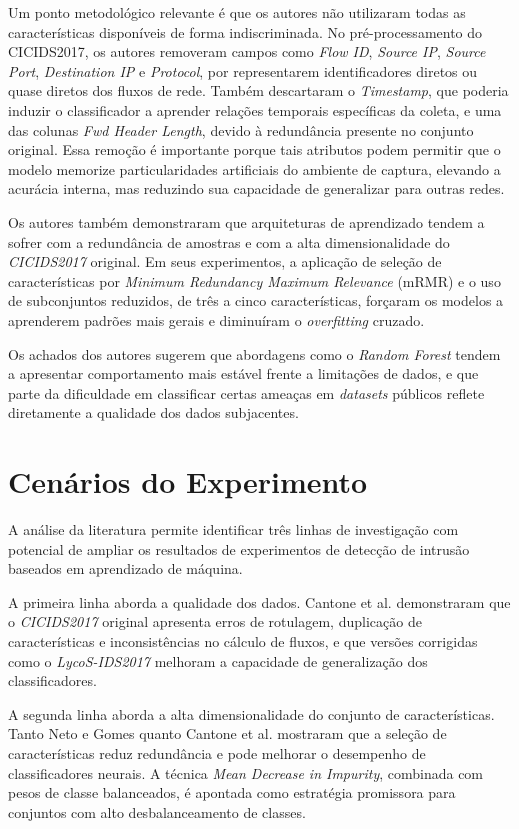 Um ponto metodológico relevante é que os autores não utilizaram todas as características disponíveis de forma indiscriminada. No pré-processamento do CICIDS2017, os autores removeram campos como \textit{Flow ID}, \textit{Source IP}, \textit{Source Port}, \textit{Destination IP} e \textit{Protocol}, por representarem identificadores diretos ou quase diretos dos fluxos de rede. Também descartaram o \textit{Timestamp}, que poderia induzir o classificador a aprender relações temporais específicas da coleta, e uma das colunas \textit{Fwd Header Length}, devido à redundância presente no conjunto original. Essa remoção é importante porque tais atributos podem permitir que o modelo memorize particularidades artificiais do ambiente de captura, elevando a acurácia interna, mas reduzindo sua capacidade de generalizar para outras redes.

Os autores também demonstraram que arquiteturas de aprendizado tendem a sofrer com a redundância de amostras e com a alta dimensionalidade do \textit{CICIDS2017} original. Em seus experimentos, a aplicação de seleção de características por \textit{Minimum Redundancy Maximum Relevance} (mRMR) e o uso de subconjuntos reduzidos, de três a cinco características, forçaram os modelos a aprenderem padrões mais gerais e diminuíram o \textit{overfitting} cruzado.

Os achados dos autores sugerem que abordagens como o \textit{Random Forest} tendem a apresentar comportamento mais estável frente a limitações de dados, e que parte da dificuldade em classificar certas ameaças em \textit{datasets} públicos reflete diretamente a qualidade dos dados subjacentes.

\section{Cenários do Experimento}

A análise da literatura permite identificar três linhas de investigação com potencial de ampliar os resultados de experimentos de detecção de intrusão baseados em aprendizado de máquina.

A primeira linha aborda a qualidade dos dados. Cantone et al. \cite{cantone2024} demonstraram que o \textit{CICIDS2017} original apresenta erros de rotulagem, duplicação de características e inconsistências no cálculo de fluxos, e que versões corrigidas como o \textit{LycoS-IDS2017} melhoram a capacidade de generalização dos classificadores.

A segunda linha aborda a alta dimensionalidade do conjunto de características. Tanto Neto e Gomes \cite{neto_gomes} quanto Cantone et al. \cite{cantone2024} mostraram que a seleção de características reduz redundância e pode melhorar o desempenho de classificadores neurais. A técnica \textit{Mean Decrease in Impurity}, combinada com pesos de classe balanceados, é apontada como estratégia promissora para conjuntos com alto desbalanceamento de classes.

